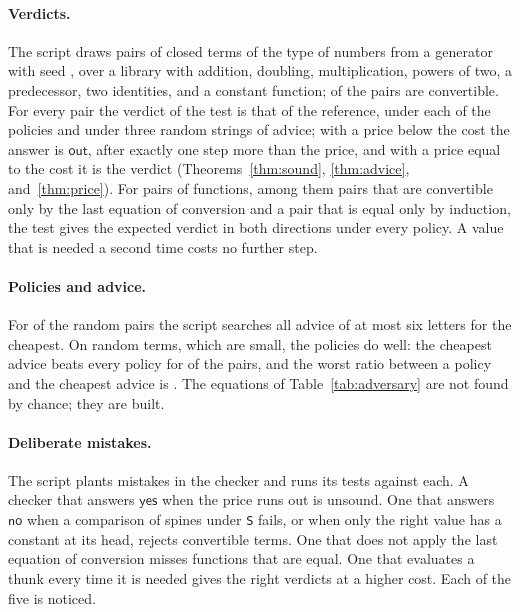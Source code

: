 \documentclass[acmsmall,nonacm,screen]{acmart}
\newcommand{\kw}[1]{\mathsf{#1}}
\newcommand{\yes}{\kw{yes}}
\newcommand{\no}{\kw{no}}
\newcommand{\out}{\kw{out}}
\newcommand{\adv}[1]{\textup{\texttt{#1}}}
\newcommand{\claim}[2]{#2}
\begin{document}
\paragraph{Verdicts.} The script draws \exPairs{} pairs of closed terms of the type of
numbers from a generator with seed \exSeed{}, over a library with addition, doubling,
multiplication, powers of two, a predecessor, two identities, and a constant function;
\exConvertible{} of the pairs are convertible. \claim{verdicts}{For every pair the verdict of
the test is that of the reference, under each of the \exPolicies{} policies and under three
random strings of advice; with a price below the cost the answer is $\out$, after exactly
one step more than the price, and with a price equal to the cost it is the verdict}
(Theorems~\ref{thm:sound}, \ref{thm:advice}, and~\ref{thm:price}). \claim{binders}{For
\exBinders{} pairs of functions, among them pairs that are convertible only by the last
equation of conversion and a pair that is equal only by induction, the test gives the
expected verdict in both directions under every policy.} \claim{sharing}{A value that is
needed a second time costs no further step.}

\paragraph{Policies and advice.} For \exSearched{} of the random pairs the script searches
all advice of at most six letters for the cheapest. On random terms, which are small, the
policies do well: the cheapest advice beats every policy for \exBetter{} of the pairs, and the
worst ratio between a policy and the cheapest advice is \exRatio{}. The equations of
Table~\ref{tab:adversary} are not found by chance; they are built.

\paragraph{Deliberate mistakes.} The script plants \exMutants{} mistakes in the checker and
runs its tests against each. A checker that answers $\yes$ when the price runs out is
unsound. One that answers $\no$ when a comparison of spines under \adv{S} fails, or when only
the right value has a constant at its head, rejects convertible terms. One that does not
apply the last equation of conversion misses functions that are equal. One that evaluates a
thunk every time it is needed gives the right verdicts at a higher cost.
\claim{all-noticed}{Each of the five is noticed.}
\end{document}
